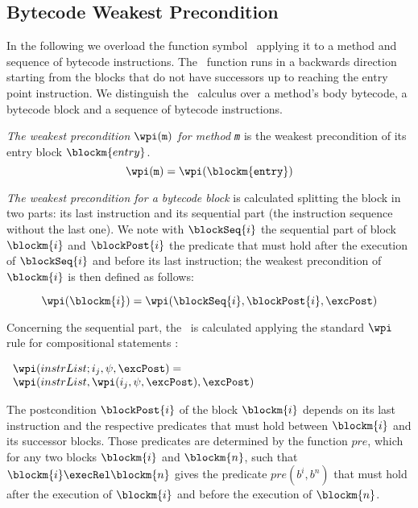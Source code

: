 
\newtheorem{blockkkPost}{Definition}
\newtheorem{pre}{Definition}

\subsection{Bytecode Weakest Precondition}\label{wpGraph}

In the following we overload the function symbol \wpi \ applying it to a method and sequence of bytecode instructions.
The \wpi \ function runs in a backwards direction starting from the blocks that do not have successors up to reaching the entry point
 instruction. We distinguish the \wpi \ calculus over a method's body bytecode, a bytecode block and a sequence of 
 bytecode instructions.

{\it The weakest precondition $\wpi(\tt{m})$ for method \texttt{m}} is the weakest precondition of its entry block
 $\blockm{entry}$. 
 $$\wpi(\tt{m}) = \wpi(\blockm{entry})$$

{\it The weakest precondition for a bytecode block} is calculated splitting the block in two parts: its last instruction and
 its sequential part (the instruction sequence without the last one). We note with $\blockSeq{i}$ the sequential part of block
  $\blockm{i}$ and $\blockPost{i}$ the predicate that must hold after the execution of $\blockSeq{i}$ and before its last instruction; 
  the weakest precondition of $\blockm{i}$ is then defined as follows:

$$ \wpi(\blockm{i}) = \wpi( \blockSeq{i}, \blockPost{i}, \excPost ) $$

Concerning the sequential part, the \wpi \ is calculated applying the standard $\wpi$ rule for compositional statements :
\begin{center}
$ \begin{array}{l} \wpi( instrList;i_{j}, \psi,\excPost ) = \\ \wpi(instrList, \wpi(i_{j}, \psi,\excPost ),\excPost ) \end{array} $
\end{center}
The postcondition $\blockPost{i}$ of the block $\blockm{i}$ depends on its last instruction and the respective predicates 
that must hold between $\blockm{i}$ and its successor blocks. Those predicates are determined by the function $pre$, which for 
any two blocks $\blockm{i}$ and $\blockm{n}$, such that $\blockm{i} \execRel \blockm{n}$ gives the predicate $pre(b^{i}, b^{n})$ that must hold
after the execution of $\blockm{i}$ and before the execution of $\blockm{n}$. 

